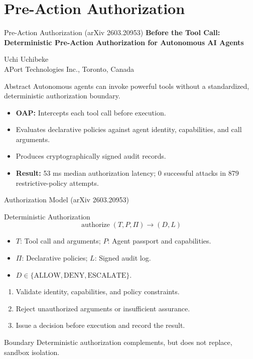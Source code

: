\documentclass[aspectratio=169]{beamer}
\begin{document}
\section{Pre-Action Authorization}
\begin{frame}{Pre-Action Authorization (arXiv 2603.20953)}
    \footnotesize
    \textbf{Before the Tool Call: Deterministic Pre-Action Authorization for Autonomous AI Agents}

    {\small Uchi Uchibeke\\APort Technologies Inc., Toronto, Canada}
    \begin{block}{Abstract}
        Autonomous agents can invoke powerful tools without a standardized, deterministic authorization boundary.
    \end{block}
    \begin{itemize}
        \item \textbf{OAP:} Intercepts each tool call before execution.
        \item Evaluates declarative policies against agent identity, capabilities, and call arguments.
        \item Produces cryptographically signed audit records.
        \item \textbf{Result:} 53 ms median authorization latency; 0 successful attacks in 879 restrictive-policy attempts.
    \end{itemize}
\end{frame}

\begin{frame}{Authorization Model (arXiv 2603.20953)}
    \begin{block}{Deterministic Authorization}
        \[\operatorname{authorize}(T,P,\Pi)\longrightarrow(D,L)\]
        \begin{itemize}
            \item $T$: Tool call and arguments; $P$: Agent passport and capabilities.
            \item $\Pi$: Declarative policies; $L$: Signed audit log.
            \item $D\in\{\text{ALLOW},\text{DENY},\text{ESCALATE}\}$.
        \end{itemize}
    \end{block}
    \begin{enumerate}
        \item Validate identity, capabilities, and policy constraints.
        \item Reject unauthorized arguments or insufficient assurance.
        \item Issue a decision before execution and record the result.
    \end{enumerate}
    \begin{alertblock}{Boundary}
        Deterministic authorization complements, but does not replace, sandbox isolation.
    \end{alertblock}
\end{frame}
\end{document}
